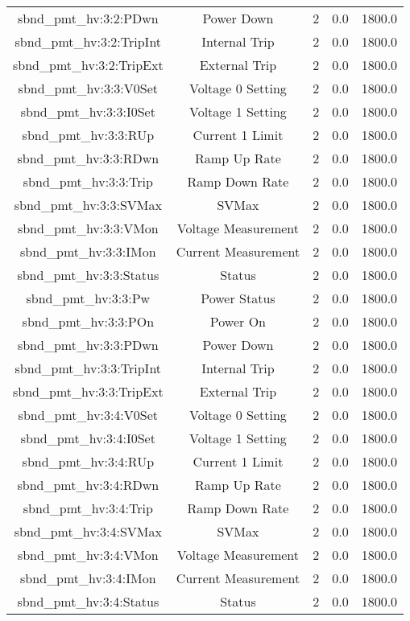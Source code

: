 \begin{center}
\begin{longtable}{c | c c c c }
sbnd\_pmt\_hv:3:2:PDwn & Power Down & 2 & 0.0 & 1800.0\\ 
sbnd\_pmt\_hv:3:2:TripInt & Internal Trip & 2 & 0.0 & 1800.0\\ 
sbnd\_pmt\_hv:3:2:TripExt & External Trip & 2 & 0.0 & 1800.0\\ 
sbnd\_pmt\_hv:3:3:V0Set & Voltage 0 Setting & 2 & 0.0 & 1800.0\\ 
sbnd\_pmt\_hv:3:3:I0Set & Voltage 1 Setting & 2 & 0.0 & 1800.0\\ 
sbnd\_pmt\_hv:3:3:RUp & Current 1 Limit & 2 & 0.0 & 1800.0\\ 
sbnd\_pmt\_hv:3:3:RDwn & Ramp Up Rate & 2 & 0.0 & 1800.0\\ 
sbnd\_pmt\_hv:3:3:Trip & Ramp Down Rate & 2 & 0.0 & 1800.0\\ 
sbnd\_pmt\_hv:3:3:SVMax & SVMax & 2 & 0.0 & 1800.0\\ 
sbnd\_pmt\_hv:3:3:VMon & Voltage Measurement & 2 & 0.0 & 1800.0\\ 
sbnd\_pmt\_hv:3:3:IMon & Current Measurement & 2 & 0.0 & 1800.0\\ 
sbnd\_pmt\_hv:3:3:Status & Status & 2 & 0.0 & 1800.0\\ 
sbnd\_pmt\_hv:3:3:Pw & Power Status & 2 & 0.0 & 1800.0\\ 
sbnd\_pmt\_hv:3:3:POn & Power On & 2 & 0.0 & 1800.0\\ 
sbnd\_pmt\_hv:3:3:PDwn & Power Down & 2 & 0.0 & 1800.0\\ 
sbnd\_pmt\_hv:3:3:TripInt & Internal Trip & 2 & 0.0 & 1800.0\\ 
sbnd\_pmt\_hv:3:3:TripExt & External Trip & 2 & 0.0 & 1800.0\\ 
sbnd\_pmt\_hv:3:4:V0Set & Voltage 0 Setting & 2 & 0.0 & 1800.0\\ 
sbnd\_pmt\_hv:3:4:I0Set & Voltage 1 Setting & 2 & 0.0 & 1800.0\\ 
sbnd\_pmt\_hv:3:4:RUp & Current 1 Limit & 2 & 0.0 & 1800.0\\ 
sbnd\_pmt\_hv:3:4:RDwn & Ramp Up Rate & 2 & 0.0 & 1800.0\\ 
sbnd\_pmt\_hv:3:4:Trip & Ramp Down Rate & 2 & 0.0 & 1800.0\\ 
sbnd\_pmt\_hv:3:4:SVMax & SVMax & 2 & 0.0 & 1800.0\\ 
sbnd\_pmt\_hv:3:4:VMon & Voltage Measurement & 2 & 0.0 & 1800.0\\ 
sbnd\_pmt\_hv:3:4:IMon & Current Measurement & 2 & 0.0 & 1800.0\\ 
sbnd\_pmt\_hv:3:4:Status & Status & 2 & 0.0 & 1800.0\\ 

\end{longtable}
\end{center}
